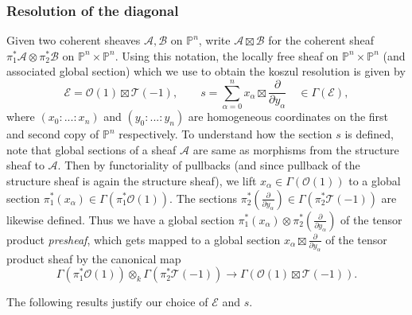 \documentclass[a4paper]{article}
\theoremstyle{definition}
\theoremstyle{remark}
\newcommand{\Pn}{\ensuremath{{\mathbb{P}^n}}}
\begin{document}
\subsubsection{Resolution of the diagonal} 
Given two coherent sheaves
\(\mathscr{A},\mathscr{B}\) on \(\Pn\), write \(\mathscr{A}\boxtimes
\mathscr{B}\) for the coherent sheaf \(\pi_1^\ast\mathscr{A}\otimes
\pi_2^\ast\mathscr{B}\) on \(\Pn \times \Pn\). Using this notation, the locally
free sheaf on \(\Pn\times \Pn\) (and associated global section) which we use to
obtain the koszul resolution is given by 
\[\mathscr{E}=\mathscr{O}(1)\boxtimes  \mathscr{T}(-1), \qquad
s=\sum_{\alpha=0}^n x_\alpha\boxtimes \frac{\partial}{\partial y_\alpha}\quad\in
\Gamma(\mathscr{E}),\] 
where \((x_0:...:x_n)\) and \((y_0:...:y_n)\) are homogeneous coordinates on the
first and second copy of \(\Pn\) respectively. To understand how the section
\(s\) is defined, note that global sections of a sheaf \(\mathscr{A}\) are same
as morphisms from the structure sheaf to \(\mathscr{A}\). Then by functoriality of
pullbacks (and since pullback of the structure sheaf is again the structure
sheaf), we lift \(x_\alpha\in \Gamma(\mathscr{O}(1))\) to a global section
\(\pi_1^\ast(x_\alpha)\in \Gamma(\pi_1^\ast \mathscr{O}(1))\). The sections
\(\pi_2^\ast(\frac{\partial}{\partial y_\alpha})\in \Gamma(\pi_2^\ast
\mathscr{T}(-1))\) are likewise defined. Thus we have a global section
\(\pi_1^\ast(x_\alpha)\otimes \pi_2^\ast(\frac{\partial}{\partial y_\alpha})\)
of the tensor product \textit{presheaf}, which gets mapped to a global section
\(x_\alpha \boxtimes \frac{\partial}{\partial y_\alpha}\) of the tensor product
sheaf by the canonical map 
\[\Gamma(\pi_1^\ast\mathscr{O}(1))\otimes_k \Gamma(\pi_2^\ast
\mathscr{T}(-1))\rightarrow \Gamma(\mathscr{O}(1)\boxtimes \mathscr{T}(-1)).\]

The following results justify our choice of \(\mathscr{E}\) and \(s\).
\end{document}
